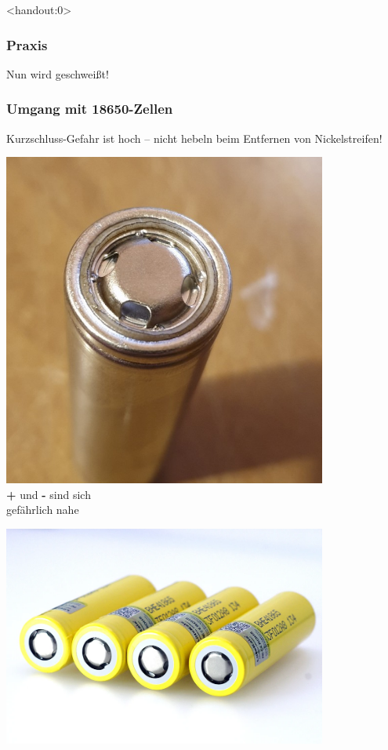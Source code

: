 \documentclass[handout, usenames,dvipsnames, nosymbols,aspectratio=169]{beamer}
\begin{document}
	\begin{frame}<handout:0>
		\frametitle{Praxis}
		\centering\Large
		Nun wird geschweißt!
	\end{frame}
	
	\begin{frame}
		\frametitle{Umgang mit 18650-Zellen}
		Kurzschluss-Gefahr ist hoch -- nicht hebeln beim Entfernen von Nickelstreifen!\\[1em]
		\begin{minipage}{0.3\textwidth}
			\centering
			\includegraphics[width=0.8\textwidth]{images/18650_naked.jpg}\\
			\textbf{+} und \textbf{-} sind sich\\
			gefährlich nahe
		\end{minipage}
		\begin{minipage}{0.35\textwidth}
			\centering	
			\includegraphics[width=0.8\textwidth]{images/18650_normal.png}\\

\end{minipage}
\end{frame}
\end{document}
